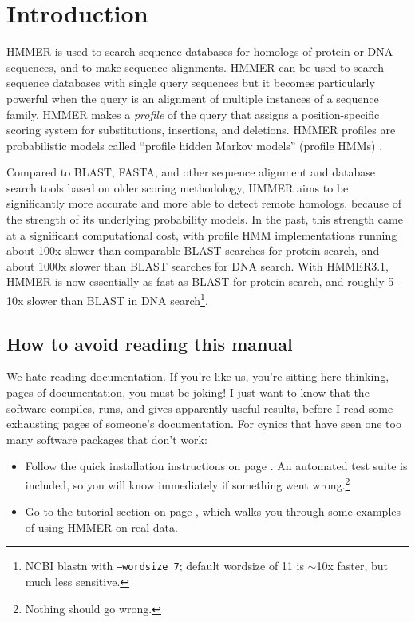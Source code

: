 \section{Introduction}
\setcounter{footnote}{0}

HMMER is used to search sequence databases for homologs of protein
or DNA sequences, and to make sequence alignments. HMMER can be used
to search sequence databases with single query sequences but it
becomes particularly powerful when the query is an alignment of multiple
instances of a sequence family. HMMER makes a \emph{profile}
of the query that assigns a position-specific scoring system for
substitutions, insertions, and deletions. HMMER profiles are
probabilistic models called ``profile hidden Markov models'' (profile
HMMs) \citep{Krogh94,Eddy98,Durbin98}.

Compared to BLAST, FASTA, and other sequence alignment and database
search tools based on older scoring methodology, HMMER aims to be
significantly more accurate and more able to detect remote homologs,
because of the strength of its underlying probability models. In the
past, this strength came at a significant computational cost, with
profile HMM implementations running about 100x slower than comparable
BLAST searches for protein search, and about 1000x slower than BLAST
searches for DNA search. With HMMER3.1, HMMER is now essentially as 
fast as BLAST for protein search, and roughly 5-10x slower than BLAST 
in DNA search\footnote{NCBI blastn with \texttt{--wordsize 7}; 
default wordsize of 11 is $\sim$10x faster, but much less sensitive.}.

\subsection{How to avoid reading this manual}

We hate reading documentation. If you're like us, you're sitting here
thinking, \pageref{manualend} pages of documentation, you must be
joking! I just want to know that the software compiles, runs, and
gives apparently useful results, before I read some 
\pageref{manualend} exhausting pages of someone's documentation. For
cynics that have seen one too many software packages that don't
work:

\begin{itemize}
\item Follow the quick installation instructions on page
      \pageref{section:installation}. An automated test suite
      is included, so you will know immediately if something
      went wrong.\footnote{Nothing should go wrong.}
\item Go to the tutorial section on page
\pageref{section:tutorial}, which walks you through some examples of
using HMMER on real data.
\end{itemize}

